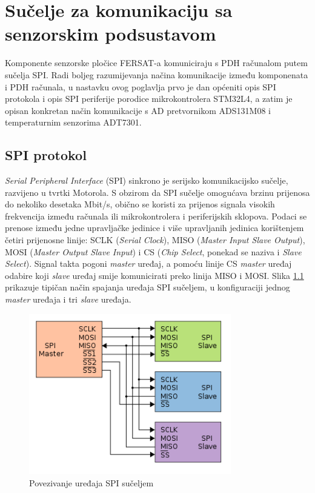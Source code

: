 \chapter{Sučelje za komunikaciju sa senzorskim podsustavom}
Komponente senzorske pločice FERSAT-a komuniciraju s PDH računalom putem sučelja SPI. Radi boljeg razumijevanja načina komunikacije između komponenata i PDH računala, u nastavku ovog poglavlja prvo je dan općeniti opis SPI protokola i opis SPI periferije porodice mikrokontrolera STM32L4, a zatim je opisan konkretan način komunikacije s AD pretvornikom ADS131M08 i temperaturnim senzorima ADT7301.

\section{SPI protokol}
\textit{Serial Peripheral Interface} (SPI) sinkrono je serijsko komunikacijsko sučelje, razvijeno u tvrtki Motorola. S obzirom da SPI sučelje omogućava brzinu prijenosa do nekoliko desetaka Mbit/s, obično se koristi za prijenos signala visokih frekvencija između računala ili mikrokontrolera i periferijskih sklopova. Podaci se prenose između jedne upravljačke jedinice  i više upravljanih jedinica  korištenjem četiri prijenosne linije: SCLK (\textit{Serial Clock}), MISO (\textit{Master Input Slave Output}), MOSI (\textit{Master Output Slave Input}) i CS (\textit{Chip Select}, ponekad se naziva i \textit{Slave Select}). Signal takta pogoni \textit{master} uređaj, a pomoću linije CS \textit{master} uređaj odabire koji \textit{slave} uređaj smije komunicirati preko linija MISO i MOSI. Slika \ref{fig:spi} prikazuje tipičan način spajanja uređaja SPI sučeljem, u konfiguraciji jednog \textit{master} uređaja i tri \textit{slave} uređaja.

\begin{figure}[htb]
	\centering
	\includegraphics[height=7cm]{slike/spi.png}
	\caption{Povezivanje uređaja SPI sučeljem \cite{spi_wikipedia}}
	\label{fig:spi}
\end{figure}

